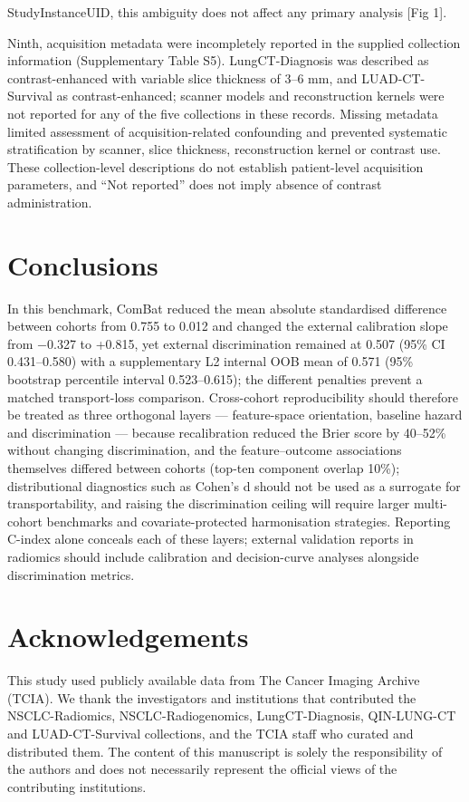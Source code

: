 \documentclass[a4paper,fleqn]{cas-sc}
\begin{document}
StudyInstanceUID, this ambiguity does not affect any primary analysis [Fig 1].

Ninth, acquisition metadata were incompletely reported in the supplied collection information (Supplementary Table S5). LungCT-Diagnosis was described as contrast-enhanced with variable slice thickness of 3--6 mm, and LUAD-CT-Survival as contrast-enhanced; scanner models and reconstruction kernels were not reported for any of the five collections in these records. Missing metadata limited assessment of acquisition-related confounding and prevented systematic stratification by scanner, slice thickness, reconstruction kernel or contrast use. These collection-level descriptions do not establish patient-level acquisition parameters, and ``Not reported'' does not imply absence of contrast administration.

\section{Conclusions}
In this benchmark, ComBat reduced the mean absolute standardised difference between cohorts from 0.755 to 0.012 and changed the external calibration slope from $-$0.327 to +0.815, yet external discrimination remained at 0.507 (95\% CI 0.431--0.580) with a supplementary L2 internal OOB mean of 0.571 (95\% bootstrap percentile interval 0.523--0.615); the different penalties prevent a matched transport-loss comparison. Cross-cohort reproducibility should therefore be treated as three orthogonal layers --- feature-space orientation, baseline hazard and discrimination --- because recalibration reduced the Brier score by 40--52\% without changing discrimination, and the feature--outcome associations themselves differed between cohorts (top-ten component overlap 10\%); distributional diagnostics such as Cohen's d should not be used as a surrogate for transportability, and raising the discrimination ceiling will require larger multi-cohort benchmarks and covariate-protected harmonisation strategies. Reporting C-index alone conceals each of these layers; external validation reports in radiomics should include calibration and decision-curve analyses alongside discrimination metrics.


\section*{Acknowledgements}
This study used publicly available data from The Cancer Imaging Archive (TCIA). We thank the investigators and institutions that contributed the NSCLC-Radiomics, NSCLC-Radiogenomics, LungCT-Diagnosis, QIN-LUNG-CT and LUAD-CT-Survival collections, and the TCIA staff who curated and distributed them. The content of this manuscript is solely the responsibility of the authors and does not necessarily represent the official views of the contributing institutions.
\end{document}
